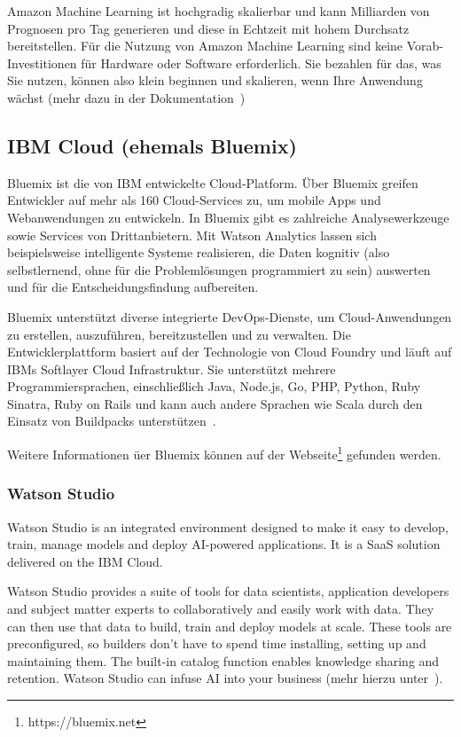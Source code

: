 Amazon Machine Learning ist hochgradig skalierbar und kann Milliarden von Prognosen pro Tag generieren und diese in
Echtzeit mit hohem Durchsatz bereitstellen. Für die Nutzung von Amazon Machine Learning sind keine Vorab-Investitionen
für Hardware oder Software erforderlich. Sie bezahlen für das, was Sie nutzen, können also klein beginnen und skalieren,
wenn Ihre Anwendung wächst (mehr dazu in der Dokumentation~\cite{online_grundlagen_aws_learning})

\subsection{IBM Cloud (ehemals Bluemix)}
Bluemix ist die von IBM entwickelte Cloud-Platform. Über Bluemix greifen Entwickler auf mehr als 160 Cloud-Services zu,
um mobile Apps und Webanwendungen zu entwickeln. In Bluemix gibt es zahlreiche Analysewerkzeuge sowie Services von
Drittanbietern. Mit Watson Analytics lassen sich beispielsweise intelligente Systeme realisieren, die Daten kognitiv
(also selbstlernend, ohne für die Problemlösungen programmiert zu sein) auswerten und für die Entscheidungsfindung
aufbereiten.

Bluemix unterstützt diverse integrierte DevOps-Dienste, um Cloud-Anwendungen zu erstellen, auszuführen, bereitzustellen
und zu verwalten. Die Entwicklerplattform basiert auf der Technologie von Cloud Foundry und läuft auf IBMs
Softlayer Cloud Infrastruktur. Sie unterstützt mehrere Programmiersprachen, einschließlich Java, Node.js, Go, PHP,
Python, Ruby Sinatra, Ruby on Rails und kann auch andere Sprachen wie Scala durch den Einsatz von Buildpacks
unterstützen~\cite{book_grundlagen_bluemix}.

Weitere Informationen üer Bluemix können auf der Webseite\footnote{https://bluemix.net} gefunden werden.

\subsubsection{Watson Studio}
Watson Studio is an integrated environment designed to make it easy to develop, train, manage models and deploy
AI-powered applications. It is a SaaS solution delivered on the IBM Cloud.

Watson Studio provides a suite of tools for data scientists, application developers and subject matter experts to
collaboratively and easily work with data. They can then use that data to build, train and deploy models at scale. These
tools are preconfigured, so builders don't have to spend time installing, setting up and maintaining them. The built-in
catalog function enables knowledge sharing and retention. Watson Studio can infuse AI into your business
(mehr hierzu unter~\cite{online_grundlagen_watson_studio}).

